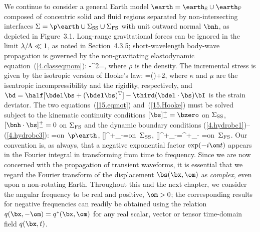 We continue to consider a general Earth model
$\earth=\earth_{\rm S}\cup\earth_{\rm F}$ composed
of concentric solid and fluid regions separated by
non-intersecting interfaces $\Sigma=\p\earth\cup
\Sigma_{\rm SS}\cup\Sigma_{\rm FS}$ with unit
outward normal $\bnh$, as depicted in Figure~3.1.
Long-range gravitational forces can be ignored
in the limit $\lambda/\hspace{-0.3 mm}\Lambda\ll 1$,
as noted in Section~4.3.5; short-wavelength body-wave
propagation is governed by
the non-gravitating elastodynamic
%
%
equation~(\ref{4.classeqmom}):
\eq \label{15.eqmot}
-\om^2\rho\hspace{0.3 mm}\bs=\bdel\cdot\bT,
\en
where $\rho$ is the density.  The incremental
stress is given by the isotropic version of
%
Hooke's law:
\eq \label{15.Hooke}
\bT=\kappa(\bdel\cdot\bs)\bI+2\mu\bd,
\en
where $\kappa$ and $\mu$ are the isentropic incompressibility and
the rigidity, respectively, and $\bd=\half[\bdel\bs+(\bdel\bs)^{\rm T}]
-\third(\bdel\cdot\bs)\bI$ is the strain deviator.
The two equations~(\ref{15.eqmot}) and~(\ref{15.Hooke})
must be solved subject
to the kinematic continuity conditions
%
%
$[\bs]^+_-=\bzero$ on $\Sigma_{\rm SS}$,
$[\bnh\cdot\bs]^+_-=0$ on $\Sigma_{\rm FS}$ and
the dynamic boundary conditions
(\ref{4.hydrobc1})--(\ref{4.hydrobc3}):
\eq \label{15.bceqn1}
\bnh\cdot\bT=\bzero\quad\mbox{on $\p\earth$},
\en
\eq \label{15.bceqn2}
[\bnh\cdot\bT]^+_-=\bzero\quad\mbox{on $\Sigma_{\rm SS}$},
\en
\eq \label{15.bceqn3}
[\bnh\cdot\bT]^+_-=\bnh[\bnh\cdot\bT\cdot\bnh]^+_-
=\bzero\quad\mbox{on $\Sigma_{\rm FS}$}.
\en
Our convention is, as always, that a negative exponential
factor $\exp(-i\om t)$ appears in the Fourier integral in
%
transforming from time to frequency.  Since we are now
concerned with the propagation of transient waveforms,
it is essential that we regard the Fourier transform of the
displacement $\bs(\bx,\om)$ as {\em complex\/}, even upon a
non-rotating Earth.  Throughout this and the next chapter,
we consider the angular frequency to be real and positive,
$\om>0$; the corresponding results for negative frequencies
can readily be obtained using the relation
$q(\bx,-\om)=q^*(\bx,\om)$ for any real scalar,
vector or tensor time-domain field $q(\bx,t)$.

